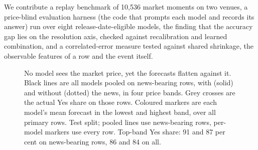 We contribute a replay benchmark of 10{,}536 market moments on two venues, a
price-blind evaluation harness (the code that prompts each model and records its
answer) run over eight release-date-eligible models, the finding
that the accuracy gap lies on the resolution axis, checked against recalibration and
learned combination, and a correlated-error measure tested against shared
shrinkage, the observable features of a row and the event itself.

\begin{figure}[!tbp]
\centering

\caption{No model sees the market price, yet the forecasts flatten against it. Black lines
are all models pooled on news-bearing rows, with (solid) and without (dotted) the news, in
four price bands. Grey crosses are the actual Yes share on those rows. Coloured markers are each model's
mean forecast in the lowest and highest band, over all primary rows. Test split; pooled lines
use news-bearing rows, per-model markers use every row. Top-band Yes share: 91 and 87 per cent
on news-bearing rows, 86 and 84 on all.}
\label{fig:forecast-vs-price}
\end{figure}
